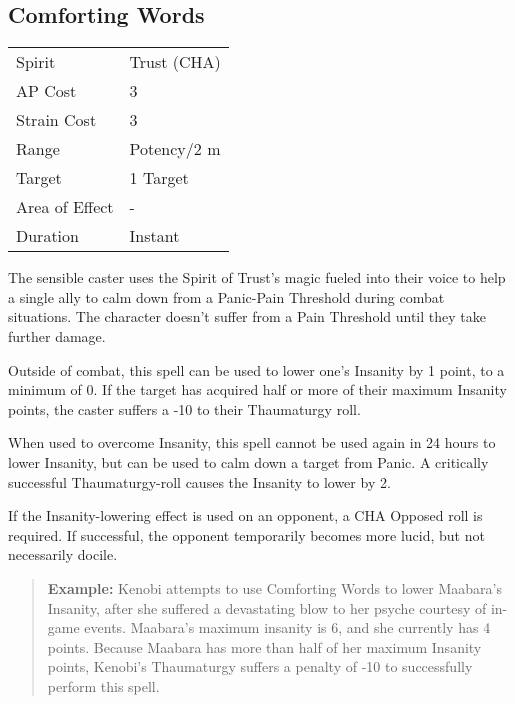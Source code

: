 \documentclass[11pt,a4paper,twocolumn]{book}
\begin{document}
\subsection*{Comforting Words}
{
	\begin{tabu} to 75mm{| X[l,4] | X[l,7] |}
		\hline
		Spirit         & Trust (CHA) \\
		AP Cost        & 3           \\
		Strain Cost    & 3           \\
		Range          & Potency/2 m \\
		Target         & 1 Target    \\
		Area of Effect & -           \\
		Duration       & Instant     \\ \hline
	\end{tabu}
	
}

\medskip

The sensible caster uses the Spirit of Trust's magic fueled into their voice to help a single ally to calm down from a Panic-Pain Threshold during combat situations. The character doesn't suffer from a Pain Threshold until they take further damage.

Outside of combat, this spell can be used to lower one's Insanity by 1 point, to a minimum of 0. If the target has acquired half or more of their maximum Insanity points, the caster suffers a -10 to their Thaumaturgy roll.

When used to overcome Insanity, this spell cannot be used again in 24 hours to lower Insanity, but can be used to calm down a target from Panic. A critically successful Thaumaturgy-roll causes the Insanity to lower by 2.

If the Insanity-lowering effect is used on an opponent, a CHA Opposed roll is required. If successful, the opponent temporarily becomes more lucid, but not necessarily docile.

\begin{verse}
	\textbf{Example:} Kenobi attempts to use Comforting Words to lower Maabara's Insanity, after she suffered a devastating blow to her psyche courtesy of in-game events. Maabara's maximum insanity is 6, and she currently has 4 points. Because Maabara has more than half of her maximum Insanity points, Kenobi's Thaumaturgy suffers a penalty of -10 to successfully perform this spell.
\end{verse}
\end{document}
